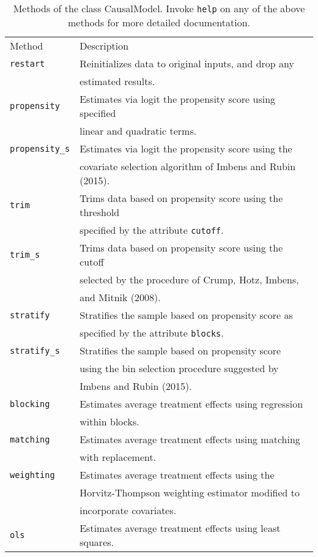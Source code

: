 \documentclass[12pt]{article}
\theoremstyle{definition}
\theoremstyle{definition}
\theoremstyle{definition}
\theoremstyle{remark}
\begin{document}
\begin{table}[h]
\begin{center}\begin{tabular}{ll}
Method & Description \\
\texttt{restart} & Reinitializes data to original inputs, and drop any \\
& estimated results. \\
\texttt{propensity} & Estimates via logit the propensity score using specified \\
& linear and quadratic terms. \\
\texttt{propensity\_s} & Estimates via logit the propensity score using the \\
& covariate selection algorithm of Imbens and Rubin (2015). \\
\texttt{trim} & Trims data based on propensity score using the threshold \\
& specified by the attribute \texttt{cutoff}. \\
\texttt{trim\_s} & Trims data based on propensity score using the cutoff \\
& selected by the procedure of Crump, Hotz, Imbens, \\
& and Mitnik (2008). \\
\texttt{stratify} & Stratifies the sample based on propensity score as \\
& specified by the attribute \texttt{blocks}. \\
\texttt{stratify\_s} & Stratifies the sample based on propensity score \\
& using the bin selection procedure suggested by \\
& Imbens and Rubin (2015). \\
\texttt{blocking} & Estimates average treatment effects using regression \\
& within blocks. \\
\texttt{matching} & Estimates average treatment effects using matching \\
& with replacement. \\
\texttt{weighting} & Estimates average treatment effects using the \\
& Horvitz-Thompson weighting estimator modified to \\
& incorporate covariates. \\
\texttt{ols} & Estimates average treatment effects using least squares.
\end{tabular}\end{center}
\caption{Methods of the class CausalModel. Invoke \texttt{help} on any of the above methods for more detailed documentation.}  \label{tab.b}
\end{table}

\end{document}
